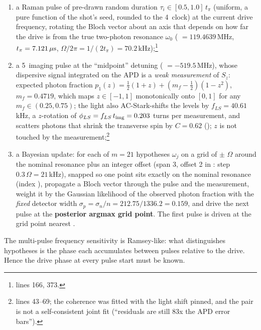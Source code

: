 \begin{enumerate}[nosep]
  \item a Raman pulse of pre-drawn random duration $\tau_i \in [0.5, 1.0]\,t_\pi$
    (uniform, a pure function of the shot's seed, rounded to the 4\nsu\ clock)
    at the current drive frequency, rotating the Bloch vector about an axis
    that depends on how far the drive is from the true two-photon resonance
    $\omega_0$ ( $= 119.4639$\,MHz, $t_\pi =
    7.121\,\mu\mathrm{s}$, $\Omega/2\pi = 1/(2t_\pi) = 70.2$\,kHz);\footnote{
    lines 166, 373.}
  \item a 5\us\ imaging pulse at the ``midpoint'' detuning
    ( $= -519.5$\,MHz), whose dispersive
    signal integrated on the APD is a \emph{weak measurement} of $S_z$: expected
    photon fraction $p_1(z) = \tfrac12(1+z) + (m_f - \tfrac12)(1 - z^2)$,
    $m_f = 0.4719$, which maps $z \in [-1, 1]$ monotonically onto $[0, 1]$
    for any $m_f \in (0.25, 0.75)$; the light also AC-Stark-shifts the levels
    by $f_{LS} = 40.61$\,kHz, a $z$-rotation of $\phi_{LS} = f_{LS}\,t_{\rm img} =
    0.203$ turns per measurement, and scatters photons that shrink the
    transverse spin by $C = 0.62$ (); $z$ is not
    touched by the measurement;\footnote{
    lines 43--69; the coherence was fitted with the light shift pinned, and
    the pair is not a self-consistent joint fit (``residuals are still 83x
    the APD error bars'').}
  \item a Bayesian update: for each of $m = 21$ hypotheses $\omega_j$ on a grid
    of $\pm\,$$\,\Omega$ around the nominal
    resonance plus an integer offset (span 3, offset 2 in :
    step $0.3\,\Omega = 21$\,kHz), snapped so one point sits exactly on the
    nominal resonance (index ), propagate a Bloch vector through
    the pulse and the measurement, weight it by the Gaussian likelihood of
    the observed photon fraction with the \emph{fixed} detector width
    $\sigma_p = \sigma_n / n = 212.75 / 1336.2 = 0.159$, and drive the next
    pulse at the \textbf{posterior argmax grid point}. The first pulse is
    driven at the grid point nearest .
\end{enumerate}

The multi-pulse frequency sensitivity is Ramsey-like: what distinguishes
hypotheses is the phase each accumulates between pulses relative to the
drive. Hence the drive phase at every pulse start must be known.

